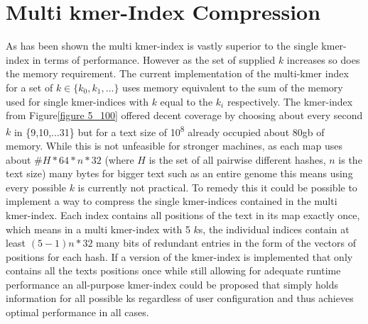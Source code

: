 \section{Multi kmer-Index Compression}
As has been shown the multi kmer-index is vastly superior to the single kmer-index in terms of performance.
However as the set of supplied $k$ increases so does the memory requirement. The current implementation of the
multi-kmer index for a set of $k\in\{k_{0}, k_{1}, ...\}$ uses memory equivalent to the sum of the memory used for
single kmer-indices with $k$ equal to the $k_{i}$ respectively.  The
kmer-index from Figure\ref{figure 5_100} offered decent coverage
by choosing about every second$k$ in \{9,10,...31\} but for a text
size of 10\textsuperscript{8} already occupied about 80gb of memory. While this is not unfeasible for stronger machines,
as each map uses about $\#H*64*n*32$ (where $H$ is the set of all pairwise different
hashes, $n$ is the text size) many bytes for bigger text such
as an entire genome this means using every possible $k$ is currently not
practical.  To remedy this it could be possible to implement a way
to compress the single kmer-indices contained in the multi kmer-index.
Each index contains all positions of the text in its map exactly
once, which means in a multi kmer-index with 5 $k$s, the individual indices
contain at least $(5-1)n*32$ many bits of redundant entries in the
form of the vectors of positions for each hash. If a version of the
kmer-index is implemented that only contains all the texts positions
once while still allowing for adequate runtime performance an all-purpose
kmer-index could be proposed that simply holds information for all
possible ks regardless of user configuration and thus achieves optimal
performance in all cases.

